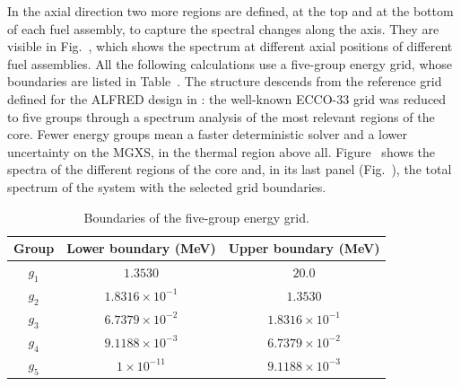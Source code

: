 In the axial direction two more regions are defined, at the top and at the bottom of each fuel assembly, to capture the spectral changes along the axis. They are visible in Fig.~, which shows the spectrum at different axial positions of different fuel assemblies.
All the following calculations use a five-group energy grid, whose boundaries are listed in Table~.
The structure descends from the reference grid defined for the ALFRED design in \citet{ENEA_report_ALFRED_energy_group}: the well-known ECCO-33 grid was reduced to five groups through a spectrum analysis of the most relevant regions of the core. Fewer energy groups mean a faster deterministic solver and a lower uncertainty on the MGXS, in the thermal region above all. Figure~ shows the spectra of the different regions of the core and, in its last panel (Fig.~), the total spectrum of the system with the selected grid boundaries.

\begin{table}[h!]
    \centering
    \caption{Boundaries of the five-group energy grid.}
    \label{sph:tab:energy_grid}
    \begin{tabular}{ccc}
        \toprule
        Group & Lower boundary (MeV) & Upper boundary (MeV) \\
        \midrule
        $g_1$ & $1.3530$ & $20.0$ \\
        $g_2$ & $1.8316 \times 10^{-1}$ & $1.3530$ \\
        $g_3$ & $6.7379 \times 10^{-2}$ & $1.8316 \times 10^{-1}$ \\
        $g_4$ & $9.1188 \times 10^{-3}$ & $6.7379 \times 10^{-2}$ \\
        $g_5$ & $1 \times 10^{-11}$ & $9.1188 \times 10^{-3}$ \\
        \bottomrule
    \end{tabular}
\end{table}


